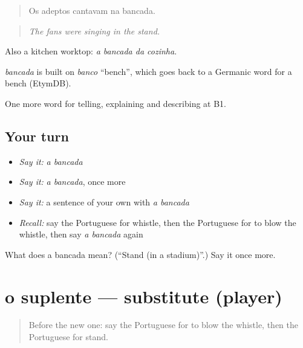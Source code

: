\begin{quote}
Os adeptos cantavam na bancada.
\end{quote}

\begin{quote}
\emph{The fans were singing in the stand.}
\end{quote}

Also a kitchen worktop: \emph{a bancada da cozinha}.

\begin{cousinweb}
\emph{bancada} is built on \emph{banco} \textquotedblleft{}bench\textquotedblright{}, which goes back to a Germanic word for a bench (EtymDB).
\end{cousinweb}

\begin{grammarlens}[title={What you've built}]
One more word for telling, explaining and describing at B1.
\end{grammarlens}

\subsection*{Your turn}
\begin{itemize}
\raggedright
  \item \emph{Say it:} \emph{a bancada}
  \item \emph{Say it:} \emph{a bancada}, once more
  \item \emph{Say it:} a sentence of your own with \emph{a bancada}
  \item \emph{Recall:} say the Portuguese for whistle, then the Portuguese for to blow the whistle, then say \emph{a bancada} again
\end{itemize}

\begin{tcolorbox}[breakable,colback=teal!4,colframe=teal!35!black,title={Before you move on}]
What does a bancada mean? (\textquotedblleft{}Stand (in a stadium)\textquotedblright{}.) Say it once more.
\end{tcolorbox}
\section[o suplente]{o suplente — substitute (player)}

\label{lesson:PT-C508-suplente}



\begin{quote}
Before the new one: say the Portuguese for to blow the whistle, then the Portuguese for stand.
\end{quote}

